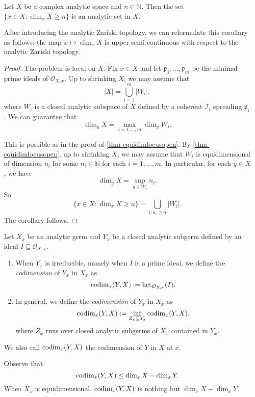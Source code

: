 \begin{corollary}
    Let $X$ be a complex analytic space and $n\in \mathbb{N}$. Then the set $\{x\in X:\dim_x X\geq n\}$ is an analytic set in $X$.

\end{corollary}
After introducing the analytic Zariski topology, we can reformulate this corollary as follows: the map $x\mapsto \dim_x X$ is upper semi-continuous with respect to the analytic Zariski topology.
\begin{proof}
    The problem is local on $X$. Fix $x\in X$ and let $\mathfrak{p}_1,\ldots,\mathfrak{p}_m$ be the minimal prime ideals of $\mathcal{O}_{X,x}$. Up to shrinking $X$, we may assume that 
    \[
        |X|=\bigcup_{i=1}^m |W_i|,  
    \]
    where $W_i$ is a closed analytic subspace of $X$ defined by a coherent $\mathcal{I}_i$ spreading $\mathfrak{p}_i$. We can guarantee that
    \[
        \dim_y X=\max_{i=1,\ldots,m}\dim_y W_i.   
    \]
    
    This is possible as in the proof of \cref{thm-equidimlocusopen}. By \cref{thm-equidimlocusopen}, up to shrinking $X$, we may assume that $W_i$ is equidimensional of dimension $n_i$ for some $n_i\in \mathbb{N}$ for each $i=1,\ldots,m$. In particular, for each $y\in X$, we have
    \[
        \dim_y X=\sup_{y\in W_i} n_i.  
    \]
    So 
    \[
        \{x\in X:\dim_x X\geq n\}=\bigcup_{i: n_i\geq n} |W_i|.  
    \]
    The corollary follows.
\end{proof}

\begin{definition}
    Let $X_x$ be an analytic germ and $Y_x$ be a closed analytic subgerm defined by an ideal $I\subseteq \mathcal{O}_{X,x}$.
    \begin{enumerate}
        \item When $Y_x$ is irreducible, namely when $I$ is a prime ideal, we define the \emph{codimension} of $Y_x$ in $X_x$ as 
            \[
                \operatorname{codim}_x(Y,X):=\operatorname{het}_{\mathcal{O}_{X,x}}(I).    
            \]
        \item In general, we define the \emph{codimension} of $Y_x$ in $X_x$ as 
        \[
            \operatorname{codim}_x(Y,X):=\inf_{Z_x\subseteq Y_x} \operatorname{codim}_x(Y,X),
        \]
        where $Z_x$ runs over closed analytic subgerms of $X_x$ contained in $Y_x$.
    \end{enumerate}
    We also call $\operatorname{codim}_x(Y,X)$ the codimension of $Y$ in $X$ at $x$.
\end{definition}
Observe that 
\[
    \operatorname{codim}_x(Y,X)\leq \dim_x X-\dim_x Y.
\]
When $X_x$ is equidimensional, $\operatorname{codim}_x(Y,X)$ is nothing but $\dim_x X-\dim_x Y$.


